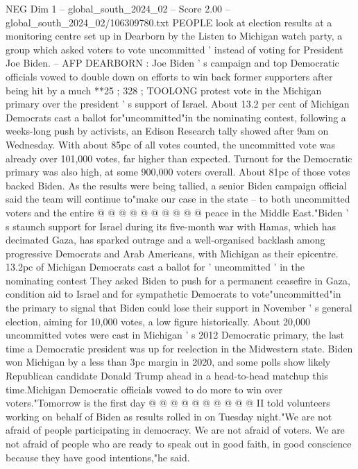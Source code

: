 \begin{textsample}{NEG Dim 1 – global\_south\_2024\_02 – Score 2.00 – global\_south\_2024\_02/106309780.txt}  \label{ex:f1_neg_424}
PEOPLE look at election results at a monitoring centre set up in Dearborn by the Listen to Michigan watch party, a group which asked voters to vote uncommitted ' instead of voting for President Joe Biden. -- AFP DEARBORN : Joe Biden ' s campaign and top Democratic officials vowed to double down on efforts to win back former supporters after being hit by a much **25 ; 328 ; TOOLONG protest vote in the Michigan primary over the president ' s support of Israel.
About 13.2 per cent of Michigan Democrats cast a ballot for"uncommitted"in the nominating contest, following a weeks-long push by activists, an Edison Research tally showed after 9am on Wednesday.
With about 85pc of all votes counted, the uncommitted vote was already over 101,000 votes, far higher than expected.
Turnout for the Democratic primary was also high, at some 900,000 voters overall.
About 81pc of those votes backed Biden.
As the results were being tallied, a senior Biden campaign official said the team will continue to"make our case in the state -- to both uncommitted voters and the entire @ @ @ @ @ @ @ @ @ @ peace in the Middle East."Biden ' s staunch support for Israel during its five-month war with Hamas, which has decimated Gaza, has sparked outrage and a well-organised backlash among progressive Democrats and Arab Americans, with Michigan as their epicentre. 13.2pc of Michigan Democrats cast a ballot for ' uncommitted ' in the nominating contest They asked Biden to push for a permanent ceasefire in Gaza, condition aid to Israel and for sympathetic Democrats to vote"uncommitted"in the primary to signal that Biden could lose their support in November ' s general election, aiming for 10,000 votes, a low figure historically.
About 20,000 uncommitted votes were cast in Michigan ' s 2012 Democratic primary, the last time a Democratic president was up for reelection in the Midwestern state.
Biden won Michigan by a less than 3pc margin in 2020, and some polls show likely Republican candidate Donald Trump ahead in a head-to-head matchup this time.Michigan Democratic officials vowed to do more to win over voters."Tomorrow is the first day @ @ @ @ @ @ @ @ @ @ II told volunteers working on behalf of Biden as results rolled in on Tuesday night."We are not afraid of people participating in democracy.
We are not afraid of voters.
We are not afraid of people who are ready to speak out in good faith, in good conscience because they have good intentions,"he said.

\end{textsample}
